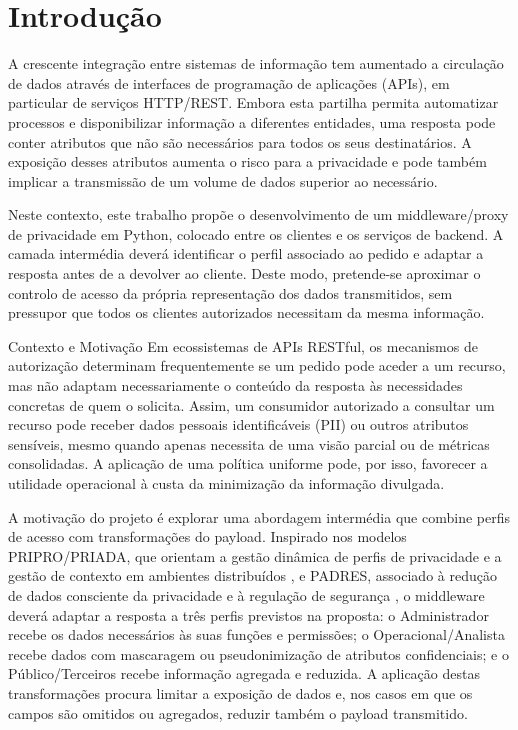 \documentclass[12pt,reqno, twoside]{amsbook}
\makeatletter
\def\section{\@startsection{section}{1}%
      \z@{.5\linespacing\@plus.7\linespacing}{.25\linespacing}%
      {\normalfont\bfseries\flushleft}}
\theoremstyle{plain}
\numberwithin{equation}{chapter}
\numberwithin{table}{chapter}
\numberwithin{figure}{chapter}
\numberwithin{section}{chapter}
\makeatother
\begin{document}
\renewcommand{\contentsname}{Índice}
\tableofcontents

\mainmatter


\setcounter{page}{1} 
\chapter{Introdução}
\noindent A crescente integração entre sistemas de informação tem aumentado a circulação de dados através de interfaces de programação de aplicações (APIs), em particular de serviços HTTP/REST. Embora esta partilha permita automatizar processos e disponibilizar informação a diferentes entidades, uma resposta pode conter atributos que não são necessários para todos os seus destinatários. A exposição desses atributos aumenta o risco para a privacidade e pode também implicar a transmissão de um volume de dados superior ao necessário.

\noindent Neste contexto, este trabalho propõe o desenvolvimento de um middleware/proxy de privacidade em Python, colocado entre os clientes e os serviços de backend. A camada intermédia deverá identificar o perfil associado ao pedido e adaptar a resposta antes de a devolver ao cliente. Deste modo, pretende-se aproximar o controlo de acesso da própria representação dos dados transmitidos, sem pressupor que todos os clientes autorizados necessitam da mesma informação.

\section{Contexto e Motivação}
\noindent Em ecossistemas de APIs RESTful, os mecanismos de autorização determinam frequentemente se um pedido pode aceder a um recurso, mas não adaptam necessariamente o conteúdo da resposta às necessidades concretas de quem o solicita. Assim, um consumidor autorizado a consultar um recurso pode receber dados pessoais identificáveis (PII) ou outros atributos sensíveis, mesmo quando apenas necessita de uma visão parcial ou de métricas consolidadas. A aplicação de uma política uniforme pode, por isso, favorecer a utilidade operacional à custa da minimização da informação divulgada.

\noindent A motivação do projeto é explorar uma abordagem intermédia que combine perfis de acesso com transformações do payload. Inspirado nos modelos PRIPRO/PRIADA, que orientam a gestão dinâmica de perfis de privacidade e a gestão de contexto em ambientes distribuídos \cite{cesconetto2020}, e PADRES, associado à redução de dados consciente da privacidade e à regulação de segurança \cite{pereira2022}, o middleware deverá adaptar a resposta a três perfis previstos na proposta: o Administrador recebe os dados necessários às suas funções e permissões; o Operacional/Analista recebe dados com mascaragem ou pseudonimização de atributos confidenciais; e o Público/Terceiros recebe informação agregada e reduzida. A aplicação destas transformações procura limitar a exposição de dados e, nos casos em que os campos são omitidos ou agregados, reduzir também o payload transmitido.
\end{document}
